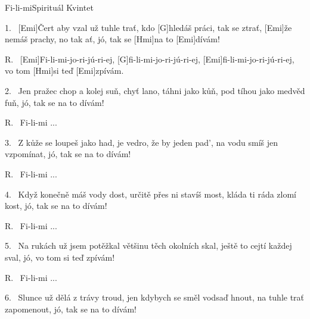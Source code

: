 \begin{song}{Fi-li-mi}{Spirituál Kvintet}

\begin{xverse}{1.~}
[\large Emi]{Čert} aby vzal už tuhle trať, kdo [\large G]hledáš práci, tak se ztrať,
[\large Emi]{že} nemáš prachy, no tak ať, jó, tak se [\large Hmi]na to [\large Emi]dívám!
\end{xverse}

\begin{xverse}{R.~}
[\large Emi]Fi-li-mi-jo-ri-jú-ri-ej,  [\large G]fi-li-mi-jo-ri-jú-ri-ej,
[\large Emi]fi-li-mi-jo-ri-jú-ri-ej, vo tom [\large Hmi]si teď [\large Emi]zpívám.
\end{xverse}

\begin{xverse}{2.~}
Jen pražec chop a kolej suň, chyť lano, táhni jako kůň,
pod tíhou jako medvěd fuň, jó, tak se na to dívám!
\end{xverse}

\begin{xverse}{R.~}
Fi-li-mi ...
\end{xverse}

\begin{xverse}{3.~}
Z kůže se loupeš jako had, je vedro, že by jeden pad',
na vodu smíš jen vzpomínat, jó, tak se na to dívám!
\end{xverse}

\begin{xverse}{R.~}
Fi-li-mi ...
\end{xverse}

\begin{xverse}{4.~}
Když konečně máš vody dost, určitě přes ni stavíš most,
kláda ti ráda zlomí kost, jó, tak se na to dívám!
\end{xverse}

\begin{xverse}{R.~}
Fi-li-mi ...
\end{xverse}

\begin{xverse}{5.~}
Na rukách už jsem potěžkal většinu těch okolních skal,
ještě to cejtí každej sval, jó, vo tom si teď zpívám!
\end{xverse}

\begin{xverse}{R.~}
Fi-li-mi ...
\end{xverse}

\begin{xverse}{6.~}
Slunce už dělá z trávy troud,
jen kdybych se směl vodsaď hnout,
na tuhle trať zapomenout, jó, tak se na to dívám!
\end{xverse}


\end{song}
